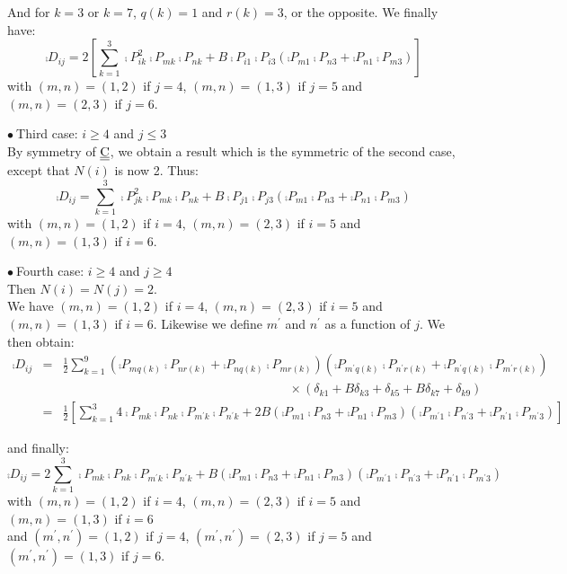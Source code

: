 And for $k=3$ or $k=7$, $q(k)=1$ and $r(k)=3$, or the opposite. We finally have:
\begin{equation}
\comp{D}_{ij}=2\left[\sum_{k=1}^3
\comp{P}_{ik}^2\comp{P}_{mk}\comp{P}_{nk}
+B\comp{P}_{i1}\comp{P}_{i3}\left(
\comp{P}_{m1}\comp{P}_{n3}+\comp{P}_{n1}\comp{P}_{m3}\right)
\right]
\end{equation}
with $(m,n)=(1,2)$ if $j=4$, $(m,n)=(1,3)$ if $j=5$ and $(m,n)=(2,3)$ if
$j=6$.

\vspace{1cm}
$\bullet\ ${\sc Third case}: $i\geqslant 4$ and $j\leqslant 3$\\
By symmetry of $\underline{\underline{\textrm{C}}}$, we obtain a result which is the symmetric of
the second case, except that $N(i)$ is now 2. Thus:
\begin{equation}
\comp{D}_{ij}=\sum_{k=1}^3
\comp{P}_{jk}^2\comp{P}_{mk}\comp{P}_{nk}
+B\comp{P}_{j1}\comp{P}_{j3}\left(
\comp{P}_{m1}\comp{P}_{n3}+\comp{P}_{n1}\comp{P}_{m3}\right)
\end{equation}
with $(m,n)=(1,2)$ if $i=4$, $(m,n)=(2,3)$ if $i=5$ and $(m,n)=(1,3)$ if
$i=6$.

\vspace{1cm}
$\bullet\ ${\sc Fourth case}: $i\geqslant 4$ and $j\geqslant 4$\\
Then $N(i)=N(j)=2$.\\
We have $(m,n)=(1,2)$ if $i=4$, $(m,n)=(2,3)$ if $i=5$ and
$(m,n)=(1,3)$ if $i=6$. Likewise we define $m^\prime$ and
$n^\prime$ as a function of $j$. We then obtain:
\begin{eqnarray}
\comp{D}_{ij}&=&\frac{1}{2}\sum_{k=1}^9
\left(\comp{P}_{mq(k)}\comp{P}_{nr(k)}+\comp{P}_{nq(k)}\comp{P}_{mr(k)}\right)
\left(\comp{P}_{m^\prime q(k)}\comp{P}_{n^\prime r(k)}
+\comp{P}_{n^\prime q(k)}\comp{P}_{m^\prime r(k)}\right)\nonumber\\
&&\qquad\qquad\qquad\qquad\qquad\qquad\qquad\qquad\qquad\times
(\delta_{k1}+B \delta_{k3}+\delta_{k5}+B \delta_{k7}+\delta_{k9})\nonumber\\
&=&\frac{1}{2}\left[
\sum_{k=1}^3 4\comp{P}_{mk}\comp{P}_{nk}
\comp{P}_{m^\prime k}\comp{P}_{n^\prime k}
+2 B \left(\comp{P}_{m1}\comp{P}_{n3}+\comp{P}_{n1}\comp{P}_{m3}\right)
\left(\comp{P}_{m^\prime 1}\comp{P}_{n^\prime 3}
+\comp{P}_{n^\prime 1}\comp{P}_{m^\prime 3}\right)\right]
\end{eqnarray}

and finally:
\begin{equation}
\comp{D}_{ij}=
2\sum_{k=1}^3  \comp{P}_{mk}\comp{P}_{nk}
\comp{P}_{m^\prime k}\comp{P}_{n^\prime k}
+B \left(\comp{P}_{m1}\comp{P}_{n3}+\comp{P}_{n1}\comp{P}_{m3}\right)
\left(\comp{P}_{m^\prime 1}\comp{P}_{n^\prime 3}
+\comp{P}_{n^\prime 1}\comp{P}_{m^\prime 3}\right)
\end{equation}
with $(m,n)=(1,2)$ if $i=4$, $(m,n)=(2,3)$ if $i=5$ and $(m,n)=(1,3)$ if
$i=6$\\
and $(m^\prime ,n^\prime )=(1,2)$ if $j=4$, $(m^\prime ,n^\prime )=(2,3)$
if $j=5$ and $(m^\prime ,n^\prime )=(1,3)$ if $j=6$.
